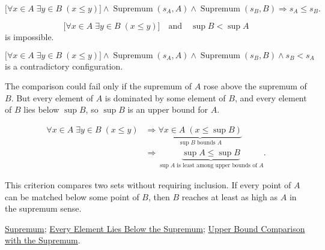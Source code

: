 \begin{remark*}
\[
\bigl[\forall x\in A\;\exists y\in B\;(x\le y)\bigr]
\land
\operatorname{Supremum}(s_A,A)\land \operatorname{Supremum}(s_B,B)
\Longrightarrow
s_A\le s_B.
\]
\end{remark*}

\begin{remark*}
\[
\bigl[\forall x\in A\;\exists y\in B\;(x\le y)\bigr]
\quad\text{and}\quad
\sup B<\sup A
\]
is impossible.
\end{remark*}

\begin{remark*}
\[
\bigl[\forall x\in A\;\exists y\in B\;(x\le y)\bigr]
\land
\operatorname{Supremum}(s_A,A)\land \operatorname{Supremum}(s_B,B)\land s_B<s_A
\]
is a contradictory configuration.
\end{remark*}

\begin{remark*}
The comparison could fail only if the supremum of $A$ rose above the supremum of $B$. But every element of $A$ is dominated by some element of $B$, and every element of $B$ lies below $\sup B$, so $\sup B$ is an upper bound for $A$.
\end{remark*}

\begin{remark*}
\[
\begin{aligned}
\forall x\in A\;\exists y\in B\;(x\le y)
&\Longrightarrow
\underbrace{\forall x\in A\;(x\le \sup B)}_{\sup B\text{ bounds }A}\\
&\Longrightarrow
\underbrace{\sup A\le \sup B}_{\sup A\text{ is least among upper bounds of }A}.
\end{aligned}
\]
\end{remark*}

\begin{remark*}[Interpretation]
This criterion compares two sets without requiring inclusion. If every point of $A$ can be matched below some point of $B$, then $B$ reaches at least as high as $A$ in the supremum sense.
\end{remark*}

\begin{remark*}[Dependencies]
\hyperref[def:supremum]{Supremum};
\hyperref[prop:every-element-lies-below-the-supremum]{Every Element Lies Below the Supremum};
\hyperref[prop:upper-bound-comparison-with-the-supremum]{Upper Bound Comparison with the Supremum}.
\end{remark*}





